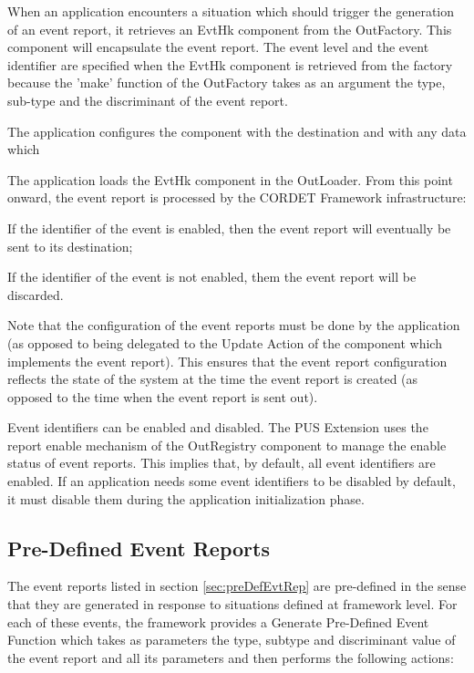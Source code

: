 \documentclass{pnp_article}
\begin{document}
\begin{fw_itemize}
\item When an application encounters a situation which should trigger the generation of an event report, it retrieves an EvtHk component from the OutFactory. This component will encapsulate the event report. The event level and the event identifier are specified when the EvtHk component is retrieved from the factory because the 'make' function of the OutFactory takes as an argument the type, sub-type and the discriminant of the event report.
\item The application configures the component with the destination and with any data which 
\item The application loads the EvtHk component in the OutLoader. From this point onward, the event report is processed by the CORDET Framework infrastructure:
	\begin{fw_itemize}
	\item If the identifier of the event is enabled, then the event report will eventually be sent to its destination;
	\item If the identifier of the event is not enabled, them the event report will be discarded.
	\end{fw_itemize}
\end{fw_itemize}

Note that the configuration of the event reports must be done by the application (as opposed to being delegated to the Update Action of the component which implements the event report). This ensures that the event report configuration reflects the state of the system at the time the event report is created (as opposed to the time when the event report is sent out).  

Event identifiers can be enabled and disabled. The PUS Extension uses the report enable mechanism of the OutRegistry component to manage the enable status of event reports. This implies that, by default, all event identifiers are enabled. If an application needs some event identifiers to be disabled by default, it must disable them during the application initialization phase.

\subsection{Pre-Defined Event Reports}\label{sec:serv5PreDefEvtRep}
The event reports listed in section \ref{sec:preDefEvtRep} are pre-defined in the sense that they are generated in response to situations defined at framework level. For each of these events, the framework provides a Generate Pre-Defined Event Function which takes as parameters the type, subtype and discriminant value of the event report and all its parameters and then performs the following actions:
\end{document}

